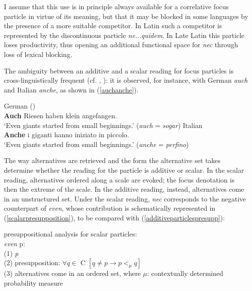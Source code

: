 \documentclass[output=paper,modfonts,nonflat,citecolor=brown,
showindex
]{langsci/langscibook}
\begin{document}
I assume that this use is in principle always available for a correlative focus particle in virtue of its meaning, but that it may be blocked in some languages by the presence of a more suitable competitor. In Latin such a competitor is represented by the discontinuous particle {\emph{ne...quidem}}. In Late Latin this particle loses productivity, thus opening an additional functional space for {\emph{nec}} through loss of lexical blocking.

The ambiguity between an additive and a scalar reading for focus particles is cross-linguistically frequent (cf. \citealt[158-159]{Koenig91}, \citealt[24-25]{GastAuwera11}): it is observed, for instance, with German {\emph{auch}} and Italian {\emph{anche}}, as shown in (\ref{auchanche}).  

{\begin{exe}
\ex \label{auchanche}
\begin{xlist}
\ex German (\citealt[62]{Koenig91})\\{\textbf{Auch}} Riesen haben klein angefangen. \\
\glt `Even giants started from small beginnings.' ({\emph{auch}} = {\emph{sogar}})
\ex Italian\\{\textbf{Anche}} i giganti hanno iniziato in piccolo.\\
\glt `Even giants started from small beginnings.' ({\emph{anche}} = {\emph{perfino}})
\end{xlist}
\end{exe}}

\noindent The way alternatives are retrieved and the form the alternative set takes determine whether the reading for the particle is additive or scalar. In the scalar reading, alternatives ordered along a scale are evoked; the focus denotation is then the extreme of the scale. In the additive reading, instead, alternatives come in an unstructured set. Under the scalar reading, {\emph{nec}} corresponds to the negative counterpart of {\emph{even}}, whose contribution is schematically represented in (\ref{scalarpresupposition}), to be compared with (\ref{additiveparticlespresupp}): %

{\begin{exe}
\ex \label{scalarpresupposition} presuppositional analysis for scalar particles:\\
{\emph{even}} p:\\
(1) {\emph{p}}\\
(2) presupposition: $\forall q \in$ C $[q \neq p \rightarrow p <_{\mu} q]$\\
(3) alternatives come in an ordered set, where ${\mu}$: contextually determined probability measure %
\end{exe}} 
\end{document}
